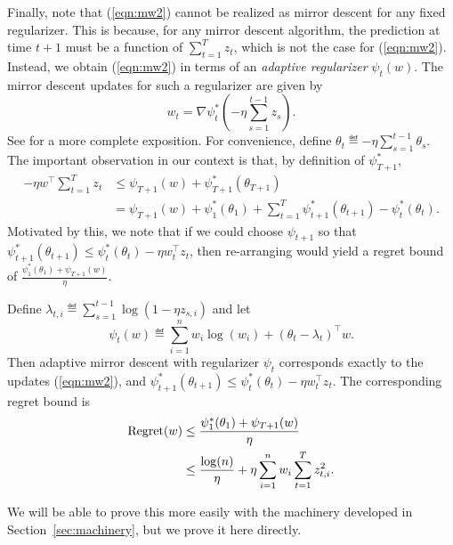 \documentclass[paper_icml.tex]{subfiles}
\begin{document}
Finally, note that (\ref{eqn:mw2}) cannot be realized as mirror descent for any 
fixed regularizer. This is because, for any mirror descent algorithm, the 
prediction at time $t+1$ must be a function of $\sum_{t=1}^T z_t$, which is 
not the case for (\ref{eqn:mw2}). Instead, we obtain (\ref{eqn:mw2}) in terms of 
an \emph{adaptive regularizer} $\psi_t(w)$. The mirror descent updates for 
such a regularizer are given by 
\[ w_{t} = \nabla \psi_t^*\left(-\eta \sum_{s=1}^{t-1} z_s\right). \]
See \cite{orabona2013general} for a more complete exposition. For convenience, 
define $\theta_t \eqdef -\eta \sum_{s=1}^{t-1} \theta_s$. The important 
observation in our context is that, by definition of $\psi_{T+1}^*$, 
\begin{align}
- \eta w^{\top} \sum_{t=1}^T z_t &\leq \psi_{T+1}(w) + \psi_{T+1}^*(\theta_{T+1}) \\
\label{eqn:telescope}
 &= \psi_{T+1}(w) + \psi_1^*(\theta_1) + \sum_{t=1}^T \psi_{t+1}^*(\theta_{t+1}) - \psi_t^*(\theta_t).
\end{align}
Motivated by this, we note that if we could choose $\psi_{t+1}$ so that 
$\psi_{t+1}^*(\theta_{t+1}) \leq \psi_{t}^*(\theta_t) - \eta w_t^{\top}z_t$, 
then re-arranging would yield a regret bound of $\frac{\psi_1^*(\theta_1) + \psi_{T+1}(w)}{\eta}$.
\begin{proposition}
\label{prop:correspondence}
Define $\lambda_{t,i} \eqdef \sum_{s=1}^{t-1} \log(1-\eta z_{s,i})$ and let
\[ \psi_t(w) \eqdef \sum_{i=1}^n w_i\log(w_i) + (\theta_t - \lambda_t)^{\top}w. \]
Then adaptive mirror descent with regularizer $\psi_t$ corresponds exactly to 
the updates (\ref{eqn:mw2}), and 
$\psi_{t+1}^*(\theta_{t+1}) \leq \psi_t^*(\theta_t) - \eta w_t^{\top}z_t$. 
The corresponding regret bound is
\begin{align}
\operatorname{Regret}(w) &\leq \frac{\psi_1^*(\theta_1) + \psi_{T+1}(w)}{\eta} \\
 &\leq \frac{\log(n)}{\eta} + \eta \sum_{i=1}^n w_i \sum_{t=1}^T z_{t,i}^2.
\end{align}
\end{proposition}
We will be able to prove this more easily with the machinery developed in 
Section~\ref{sec:machinery}, but we prove it here directly.
\end{document}
